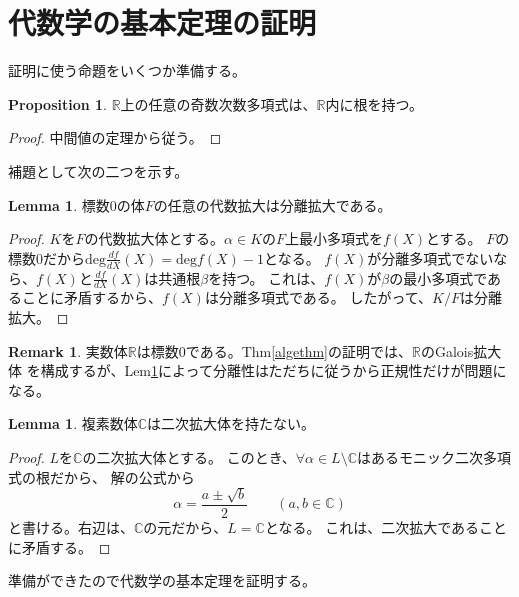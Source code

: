 \documentclass[dvipdfmx]{jsarticle}
\theoremstyle{definition}
\newtheorem{prop}[definition]{Proposition}
\newtheorem{lemma}[definition]{Lemma}
\newtheorem{remark}[definition]{Remark}
\begin{document}
\section{代数学の基本定理の証明}
証明に使う命題をいくつか準備する。
\begin{prop}\label{fact}
  $\mathbb{R}$上の任意の奇数次数多項式は、$\mathbb{R}$内に根を持つ。
\end{prop}
\begin{proof}
  中間値の定理から従う。
\end{proof}
補題として次の二つを示す。
\begin{lemma}\label{kannzennsei}
 標数0の体$F$の任意の代数拡大は分離拡大である。
\end{lemma}\label{nijikakudainohukanousei}
\begin{proof}
  $K$を$F$の代数拡大体とする。$\alpha\in K$の$F$上最小多項式を$f(X)$とする。
  $F$の標数0だから$\mathrm{deg}\frac{df}{dX}(X)=\mathrm{deg}f(X)-1$となる。
  $f(X)$が分離多項式でないなら、$f(X)$と$\frac{df}{dX}(X)$は共通根$\beta$を持つ。
  これは、$f(X)$が$\beta$の最小多項式であることに矛盾するから、$f(X)$は分離多項式である。
  したがって、$K/F$は分離拡大。
\end{proof}
\begin{remark}
実数体$\mathbb{R}$は標数0である。Thm\ref{algethm}の証明では、$\mathbb{R}$のGalois拡大体
を構成するが、Lem\ref{kannzennsei}によって分離性はただちに従うから正規性だけが問題になる。

\end{remark}
\begin{lemma}
  複素数体$\mathbb{C}$は二次拡大体を持たない。
\end{lemma}
\begin{proof}
$L$を$\mathbb{C}$の二次拡大体とする。
このとき、$\forall\alpha\in L\setminus \mathbb{C}$はあるモニック二次多項式の根だから、
解の公式から
\[\alpha=\frac{a\pm \sqrt{b}}{2}\qquad(a,b\in\mathbb{C})\]
と書ける。右辺は、$\mathbb{C}$の元だから、$L=\mathbb{C}$となる。
これは、二次拡大であることに矛盾する。
\end{proof}
準備ができたので代数学の基本定理を証明する。
\end{document}
